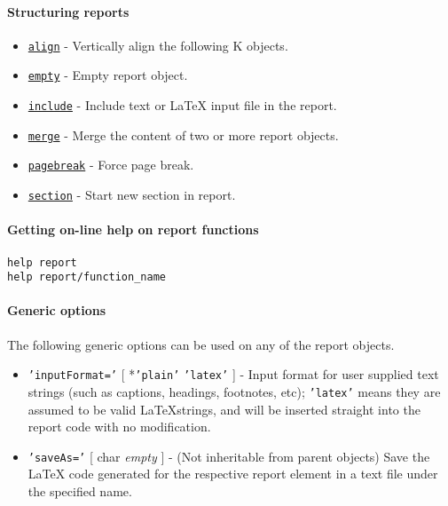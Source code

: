 \paragraph{Structuring reports}\label{structuring-reports}

\begin{itemize}
\itemsep1pt\parskip0pt
\item
  \href{report/align}{\texttt{align}} - Vertically align the following K
  objects.
\item
  \href{report/empty}{\texttt{empty}} - Empty report object.
\item
  \href{report/include}{\texttt{include}} - Include text or LaTeX input
  file in the report.
\item
  \href{report/merge}{\texttt{merge}} - Merge the content of two or more
  report objects.
\item
  \href{report/pagebreak}{\texttt{pagebreak}} - Force page break.
\item
  \href{report/section}{\texttt{section}} - Start new section in report.
\end{itemize}

\paragraph{Getting on-line help on report
functions}\label{getting-on-line-help-on-report-functions}

\begin{verbatim}
help report
help report/function_name
\end{verbatim}

\paragraph{Generic options}\label{generic-options}

The following generic options can be used on any of the report objects.

\begin{itemize}
\item
  \texttt{'inputFormat='} {[} *\texttt{'plain'} \textbar{}
  \texttt{'latex'} {]} - Input format for user supplied text strings
  (such as captions, headings, footnotes, etc); \texttt{'latex'} means
  they are assumed to be valid \LaTeX strings, and will be inserted
  straight into the report code with no modification.
\item
  \texttt{'saveAs='} {[} char \textbar{} \emph{empty} {]} - (Not
  inheritable from parent objects) Save the LaTeX code generated for the
  respective report element in a text file under the specified name.
\end{itemize}



